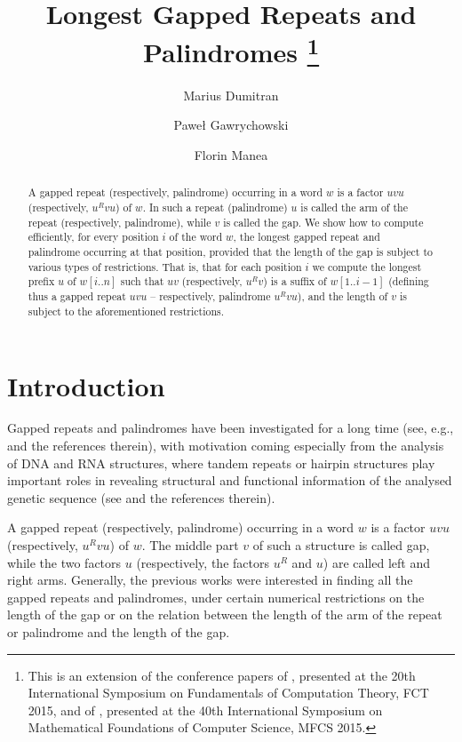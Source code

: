 \documentclass[final]{dmtcs-episciences}
\author{Marius Dumitran\affiliationmark{1} \and Pawe\l{} Gawrychowski\affiliationmark{2} \and Florin Manea\affiliationmark{3}}
\title[Longest Gapped Repeats and Palindromes]{Longest Gapped Repeats and Palindromes
\thanks{This is an extension of the conference papers of \cite{fct}, presented at the 20th International Symposium on
Fundamentals of Computation Theory, FCT 2015, and of \cite{mfcs}, presented at the 40th International Symposium on
Mathematical Foundations of Computer Science, MFCS 2015.}}
\affiliation{
  Faculty of Mathematics and Computer Science, University of Bucharest \\
  Institute of Computer Science, University of Wroc\l{}aw\\
  Department of Computer Science, Kiel University}
\begin{document}
\maketitle
\begin{abstract}
A gapped repeat (respectively, palindrome) occurring in a word $w$ is a factor $uvu$ (respectively, $u^Rvu$) of $w$. In such a repeat (palindrome) $u$ is called the arm of the repeat (respectively, palindrome), while $v$ is called the gap. 
We show how to compute efficiently, for every position $i$ of the word $w$, the longest gapped repeat and palindrome occurring at that position, provided that the length of the gap is subject to various types of restrictions. That is, that for each position $i$ we compute the longest prefix $u$ of $w[i..n]$ such that $uv$ (respectively, $u^Rv$) is a suffix of $w[1..i-1]$ (defining thus a gapped repeat $uvu$ -- respectively, palindrome $u^Rvu$), and the length of $v$ is subject to the aforementioned restrictions.
\end{abstract}

\section{Introduction}
Gapped repeats and palindromes have been investigated for a long time (see, e.g., \cite{Gu97,Brodal,KK_SPIRE,KK09,KolpakovPPK14,power_of_SA,Cro2011} and the references therein), with motivation coming especially from the analysis of DNA and RNA structures, where tandem repeats or hairpin structures play important roles in revealing structural and functional information of the analysed genetic sequence (see \cite{Gu97,Brodal,KK09} and the references therein). 

A gapped repeat (respectively, palindrome) occurring in a word $w$ is a factor $uvu$ (respectively, $u^Rvu$) of $w$. The middle part $v$ of such a structure is called gap, while the two factors $u$ (respectively, the factors $u^R$ and $u$) are called left and right arms. Generally, the previous works were interested in finding all the gapped repeats and palindromes, under certain numerical restrictions on the length of the gap or on the relation between the length of the arm of the repeat or palindrome and the length of the gap.
\end{document}
